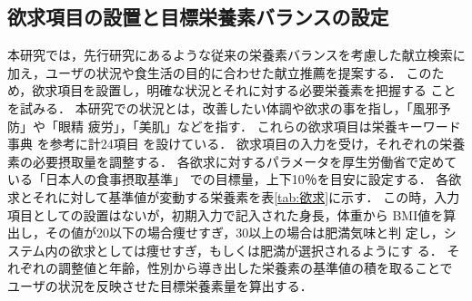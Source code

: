 \documentclass[11pt,titlepage,uplatex]{ujreport}
\begin{document}
\subsection{欲求項目の設置と目標栄養素バランスの設定}
本研究では，先行研究にあるような従来の栄養素バランスを考慮した献立検索に
加え，ユーザの状況や食生活の目的に合わせた献立推薦を提案する．
このため，欲求項目を設置し，明確な状況とそれに対する必要栄養素を把握する
ことを試みる．
本研究での状況とは，改善したい体調や欲求の事を指し，「風邪予防」や「眼精
疲労」，「美肌」などを指す．
これらの欲求項目は栄養キーワード事典 \cite{igarashi05} を参考に計24項目
を設けている．
欲求項目の入力を受け，それぞれの栄養素の必要摂取量を調整する．
各欲求に対するパラメータを厚生労働省で定めている「日本人の食事摂取基準」
での目標量，上下10％を目安に設定する．
各欲求とそれに対して基準値が変動する栄養素を表\ref{tab:欲求}に示す．
この時，入力項目としての設置はないが，初期入力で記入された身長，体重から
BMI値を算出し，その値が20以下の場合痩せすぎ，30以上の場合は肥満気味と判
定し，システム内の欲求としては痩せすぎ，もしくは肥満が選択されるようにす
る．
それぞれの調整値と年齢，性別から導き出した栄養素の基準値の積を取ることで
ユーザの状況を反映させた目標栄養素量を算出する．
\begingroup
\end{document}

